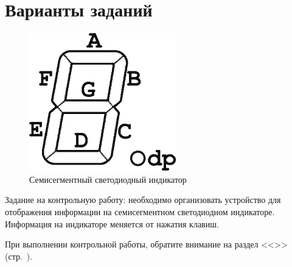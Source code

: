 \documentclass[main.tex]{subfiles}
\begin{document}
\newpage
\section{Варианты заданий}\label{ch:var1}

\begin{figure}[h]
\centering
\includegraphics[scale=0.3]{images/pin.png}
\caption{Семисегментный светодиодный индикатор}
\label{fig:pin}
\end{figure}

Задание на контрольную работу: необходимо организовать устройство для отображения информации на семисегментном светодиодном индикаторе. Информация на индикаторе меняется от нажатия клавиш.

При выполнении контрольной работы, обратите внимание на раздел <<>> (стр.~\pageref{ch:str}).
\end{document}
